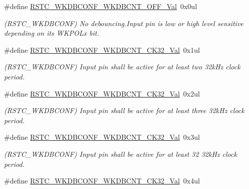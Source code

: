 \begin{DoxyCompactItemize}
\item 
\hypertarget{group___s_a_m_l21___r_s_t_c_ga66f6750ab0649d375b9dab6ba59dedce}{}\#define \hyperlink{group___s_a_m_l21___r_s_t_c_ga66f6750ab0649d375b9dab6ba59dedce}{R\+S\+T\+C\+\_\+\+W\+K\+D\+B\+C\+O\+N\+F\+\_\+\+W\+K\+D\+B\+C\+N\+T\+\_\+\+O\+F\+F\+\_\+\+Val}~0x0ul\label{group___s_a_m_l21___r_s_t_c_ga66f6750ab0649d375b9dab6ba59dedce}

\begin{DoxyCompactList}\small\item\em (R\+S\+T\+C\+\_\+\+W\+K\+D\+B\+C\+O\+N\+F) No debouncing.\+Input pin is low or high level sensitive depending on its W\+K\+P\+O\+Lx bit. \end{DoxyCompactList}\item 
\hypertarget{group___s_a_m_l21___r_s_t_c_ga607221f82e1731394e9cd0cbbfb0f276}{}\#define \hyperlink{group___s_a_m_l21___r_s_t_c_ga607221f82e1731394e9cd0cbbfb0f276}{R\+S\+T\+C\+\_\+\+W\+K\+D\+B\+C\+O\+N\+F\+\_\+\+W\+K\+D\+B\+C\+N\+T\+\_\+C\+K32\+\_\+\+Val}~0x1ul\label{group___s_a_m_l21___r_s_t_c_ga607221f82e1731394e9cd0cbbfb0f276}

\begin{DoxyCompactList}\small\item\em (R\+S\+T\+C\+\_\+\+W\+K\+D\+B\+C\+O\+N\+F) Input pin shall be active for at least two 32k\+Hz clock period. \end{DoxyCompactList}\item 
\hypertarget{group___s_a_m_l21___r_s_t_c_gaa2aeafab04946b75150126bfb34a50db}{}\#define \hyperlink{group___s_a_m_l21___r_s_t_c_gaa2aeafab04946b75150126bfb34a50db}{R\+S\+T\+C\+\_\+\+W\+K\+D\+B\+C\+O\+N\+F\+\_\+\+W\+K\+D\+B\+C\+N\+T\+\_\+C\+K32\+\_\+\+Val}~0x2ul\label{group___s_a_m_l21___r_s_t_c_gaa2aeafab04946b75150126bfb34a50db}

\begin{DoxyCompactList}\small\item\em (R\+S\+T\+C\+\_\+\+W\+K\+D\+B\+C\+O\+N\+F) Input pin shall be active for at least three 32k\+Hz clock period. \end{DoxyCompactList}\item 
\hypertarget{group___s_a_m_l21___r_s_t_c_ga2c8394abff73e05170032f4b4aa5f0d5}{}\#define \hyperlink{group___s_a_m_l21___r_s_t_c_ga2c8394abff73e05170032f4b4aa5f0d5}{R\+S\+T\+C\+\_\+\+W\+K\+D\+B\+C\+O\+N\+F\+\_\+\+W\+K\+D\+B\+C\+N\+T\+\_\+C\+K32\+\_\+\+Val}~0x3ul\label{group___s_a_m_l21___r_s_t_c_ga2c8394abff73e05170032f4b4aa5f0d5}

\begin{DoxyCompactList}\small\item\em (R\+S\+T\+C\+\_\+\+W\+K\+D\+B\+C\+O\+N\+F) Input pin shall be active for at least 32 32k\+Hz clock period. \end{DoxyCompactList}\item 
\hypertarget{group___s_a_m_l21___r_s_t_c_ga16fd49e34d93c9bdf781b8f5e21baf88}{}\#define \hyperlink{group___s_a_m_l21___r_s_t_c_ga16fd49e34d93c9bdf781b8f5e21baf88}{R\+S\+T\+C\+\_\+\+W\+K\+D\+B\+C\+O\+N\+F\+\_\+\+W\+K\+D\+B\+C\+N\+T\+\_\+C\+K32\+\_\+\+Val}~0x4ul\label{group___s_a_m_l21___r_s_t_c_ga16fd49e34d93c9bdf781b8f5e21baf88}


\end{DoxyCompactItemize}
